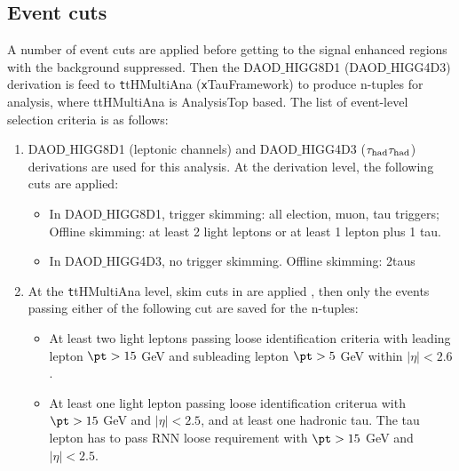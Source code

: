 \subsection{Event cuts}
\label{sec:cuts}

A number of event cuts are applied before getting to the signal enhanced regions with the background suppressed. Then the DAOD$\_$HIGG8D1 (DAOD$\_$HIGG4D3) derivation is feed to {\texttt ttHMultiAna} ({\texttt xTauFramework}) to produce n-tuples for analysis, where ttHMultiAna is AnalysisTop \cite{AnalysisTop} based. The list of event-level selection criteria is as follows:

\begin{enumerate}
\item DAOD$\_$HIGG8D1 (leptonic channels) and DAOD$\_$HIGG4D3 ($\tau_\text{had}{}\tau_\text{had}$) derivations are used for this analysis. At the derivation level, the following cuts are applied:
  \begin{itemize}
  \item In DAOD$\_$HIGG8D1, trigger skimming: all election, muon, tau triggers; Offline skimming: at least 2 light leptons or at least 1 lepton plus 1 tau.
  \item In DAOD$\_$HIGG4D3, no trigger skimming. Offline skimming: 2taus
  \end{itemize}
\item At the {\texttt ttHMultiAna} level, skim cuts in \cite{ATL-COM-PHYS-2018-410} are applied , then only the events passing either of the following cut are saved for the n-tuples:
  \begin{itemize}
  \item At least two light leptons passing loose identification criteria with leading lepton $\pt > 15$ GeV and subleading lepton $\pt > 5$ GeV within $|\eta|<2.6$.
  \item At least one light lepton passing loose identification criterua with $\pt >15$ GeV and $|\eta|<2.5$, and at least one hadronic tau. The tau lepton has to pass RNN loose requirement with $\pt >15$ GeV and $|\eta|<2.5$.
  \end{itemize}


\end{enumerate}
